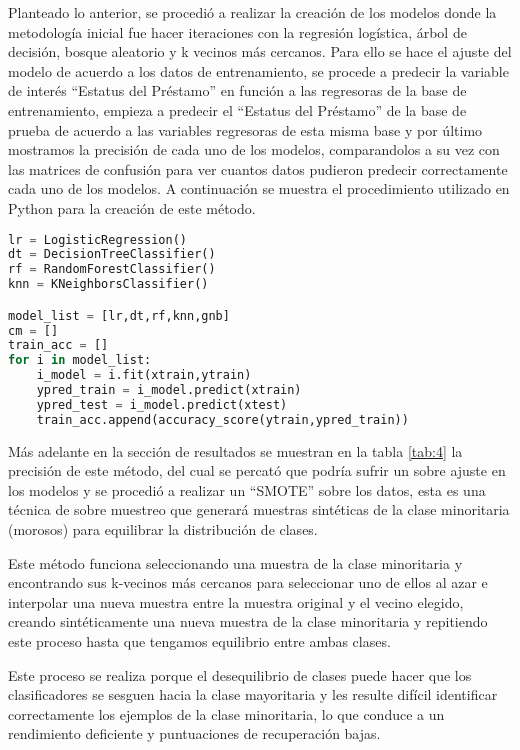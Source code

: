 \documentclass[a4paper,12pt]{article}
\begin{document}
Planteado lo anterior, se procedió a realizar la creación de los modelos donde la metodología inicial fue hacer iteraciones con la regresión logística, árbol de decisión, bosque aleatorio y k vecinos más cercanos. Para ello se hace el ajuste del modelo de acuerdo a los datos de entrenamiento, se procede a predecir la variable de interés ``Estatus del Préstamo'' en función a las regresoras de la base de entrenamiento, empieza a predecir el ``Estatus del Préstamo'' de la base de prueba de acuerdo a las variables regresoras de esta misma base y por último mostramos la precisión de cada uno de los modelos, comparandolos a su vez con las matrices de confusión para ver cuantos datos pudieron predecir correctamente cada uno de los modelos. A continuación se muestra el procedimiento utilizado en Python para la creación de este método.

\begin{lstlisting}[language=Python, caption=Procedimiento de Ajuste y Predicción por Modelo]
lr = LogisticRegression()
dt = DecisionTreeClassifier()
rf = RandomForestClassifier()
knn = KNeighborsClassifier()

model_list = [lr,dt,rf,knn,gnb]
cm = []
train_acc = []
for i in model_list:
    i_model = i.fit(xtrain,ytrain)
    ypred_train = i_model.predict(xtrain)
    ypred_test = i_model.predict(xtest)
    train_acc.append(accuracy_score(ytrain,ypred_train))
\end{lstlisting}

Más adelante en la sección de resultados se muestran en la tabla \ref{tab:4} la precisión de este método, del cual se percató que podría sufrir un sobre ajuste en los modelos y se procedió a realizar un ``SMOTE'' sobre los datos, esta es una técnica de sobre muestreo que generará muestras sintéticas de la clase minoritaria (morosos) para equilibrar la distribución de clases.

Este método funciona seleccionando una muestra de la clase minoritaria y encontrando sus k-vecinos más cercanos para seleccionar uno de ellos al azar e interpolar una nueva muestra entre la muestra original y el vecino elegido, creando sintéticamente una nueva muestra de la clase minoritaria y repitiendo este proceso hasta que tengamos equilibrio entre ambas clases.

Este proceso se realiza porque el desequilibrio de clases puede hacer que los clasificadores se sesguen hacia la clase mayoritaria y les resulte difícil identificar correctamente los ejemplos de la clase minoritaria, lo que conduce a un rendimiento deficiente y puntuaciones de recuperación bajas.
\end{document}
